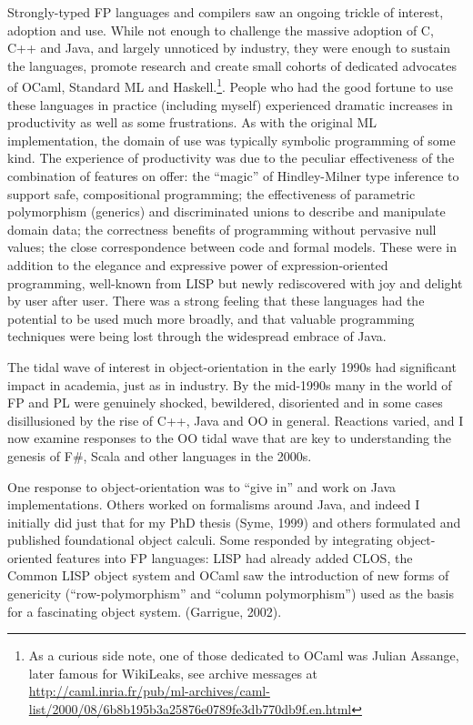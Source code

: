 \documentclass[acmsmall,review]{acmart}\settopmatter{printfolios=true,printccs=false,printacmref=false}
\begin{document}
Strongly-typed FP languages and compilers saw an ongoing trickle of interest, adoption and use. While not enough to challenge the massive adoption of C, C++ and Java, and largely unnoticed by industry, they were enough to sustain the languages, promote research and create small cohorts of dedicated advocates of OCaml, Standard ML and Haskell.\footnote{As a curious side note, one of those dedicated to OCaml was Julian Assange, later famous for WikiLeaks, see archive messages at \url{http://caml.inria.fr/pub/ml-archives/caml-list/2000/08/6b8b195b3a25876e0789fe3db770db9f.en.html}}.   People who had the good fortune to use these languages in practice (including myself) experienced dramatic increases in productivity as well as some frustrations. As with the original ML implementation, the domain of use was typically symbolic programming of some kind. The experience of productivity was due to the peculiar effectiveness of the combination of features on offer: the “magic” of Hindley-Milner type inference to support safe, compositional programming; the effectiveness of parametric polymorphism (generics) and discriminated unions to describe and manipulate domain data; the correctness benefits of programming without pervasive null values; the close correspondence between code and formal models. These were in addition to the elegance and expressive power of expression-oriented programming, well-known from LISP but newly rediscovered with joy and delight by user after user. There was a strong feeling that these languages had the potential to be used much more broadly, and that valuable programming techniques were being lost through the widespread embrace of Java.  

The tidal wave of interest in object-orientation in the early 1990s had significant impact in academia, just as in industry.  By the mid-1990s many in the world of FP and PL were genuinely shocked, bewildered, disoriented and in some cases disillusioned by the rise of C++, Java and OO in general.  Reactions varied, and I now examine responses to the OO tidal wave that are key to understanding the genesis of F\#, Scala and other languages in the 2000s. 

One response to object-orientation was to “give in” and work on Java implementations. Others worked on formalisms around Java, and indeed I initially did just that for my PhD thesis (Syme, 1999) and others formulated and published foundational object calculi. Some responded by integrating object-oriented features into FP languages: LISP had already added CLOS, the Common LISP object system and OCaml saw the introduction of new forms of genericity (“row-polymorphism” and “column polymorphism”) used as the basis for a fascinating object system. (Garrigue, 2002).
\end{document}
